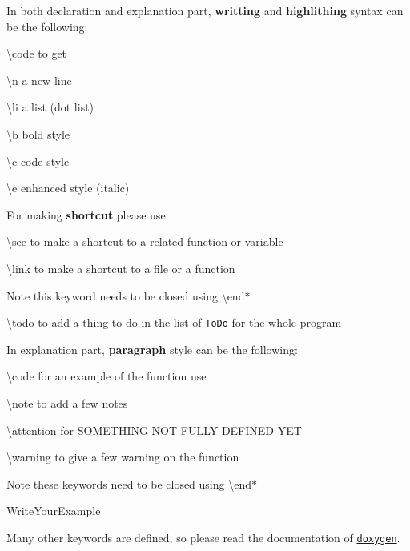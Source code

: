 In both declaration and explanation part, {\bfseries writting} and {\bfseries highlithing} syntax can be the following\-:\par
\par
 \begin{DoxyItemize}
\item {\ttfamily \textbackslash{}code} to get\par
\end{DoxyItemize}
\begin{DoxyItemize}
\item {\ttfamily \textbackslash{}n} a new line \item {\ttfamily \textbackslash{}li} a list (dot list)\end{DoxyItemize}
\begin{DoxyItemize}
\item {\ttfamily \textbackslash{}b} bold style \item {\ttfamily \textbackslash{}c} code style \item {\ttfamily \textbackslash{}e} enhanced style (italic)\end{DoxyItemize}
For making {\bfseries shortcut} please use\-:\par
 \begin{DoxyItemize}
\item {\ttfamily \textbackslash{}see} to make a shortcut to a related function or variable \item {\ttfamily \textbackslash{}link} to make a shortcut to a file or a function \begin{DoxyNote}{Note}
this keyword needs to be closed using {\ttfamily \textbackslash{}end$\ast$} 
\end{DoxyNote}
\item {\ttfamily \textbackslash{}todo} to add a thing to do in the list of \href{todo.html}{\tt To\-Do} for the whole program\end{DoxyItemize}
In explanation part, {\bfseries paragraph} style can be the following\-:\par
 \begin{DoxyItemize}
\item {\ttfamily \textbackslash{}code} for an example of the function use \item {\ttfamily \textbackslash{}note} to add a few notes \item {\ttfamily \textbackslash{}attention} for S\-O\-M\-E\-T\-H\-I\-N\-G N\-O\-T F\-U\-L\-L\-Y D\-E\-F\-I\-N\-E\-D Y\-E\-T \item {\ttfamily \textbackslash{}warning} to give a few warning on the function \begin{DoxyNote}{Note}
these keywords need to be closed using {\ttfamily \textbackslash{}end$\ast$} 
\end{DoxyNote}

\begin{DoxyVerbInclude}
\code
  WriteYourExample
\endcode
\end{DoxyVerbInclude}
\end{DoxyItemize}
Many other keywords are defined, so please read the documentation of \href{http://www.doxygen.org/commands.html}{\tt doxygen}. 